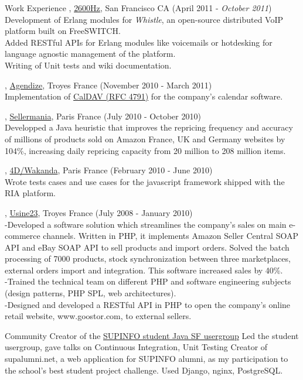 \documentclass{resume}
\begin{document}
\begin{category}{Work Experience}
,  \href{http://www.2600hz.com/}{2600Hz}, San Francisco CA (April 2011 - \emph{October 2011})\\
Development of Erlang modules for \emph{Whistle}, an open-source distributed VoIP platform built on FreeSWITCH.\\
Added RESTful APIs for Erlang modules like voicemails or hotdesking for language agnostic 
management of the platform.\\
Writing of Unit tests and wiki documentation.

, \href{http://www.agendize.com/}{Agendize}, Troyes France (November 2010 - March 2011)\\
Implementation of \href{http://www.ietf.org/rfc/rfc4791.txt}{CalDAV (RFC 4791)} for the company's calendar software.

, \href{http://www.sellermania.co.uk/}{Sellermania}, Paris France (July 2010 - October 2010)\\
Developped a Java heuristic that improves the repricing frequency and accuracy of millions of 
products sold on Amazon France, UK and Germany websites by 104\%, 
increasing daily repricing capacity from 20 million to 208 million items.

, \href{http://www.wakanda.org/}{4D/Wakanda}, Paris France (February 2010 - June 2010)\\
Wrote tests cases and use cases for the javascript framework shipped with the RIA platform.

, \href{http://www.usine23.com/}{Usine23}, Troyes France (July 2008 - January 2010)\\
-Developed a software solution which streamlines the company’s sales on main e-commerce channels. Written in PHP, it implements Amazon Seller Central SOAP API and eBay SOAP API to sell products and import orders. Solved the batch processing of 7000 products, stock synchronization between three marketplaces, external orders import and integration. This software increased sales by 40\%.\\
-Trained the technical team on different PHP and software engineering subjects (design patterns, PHP SPL, web architectures).\\
-Designed and developed a RESTful API in PHP to open the company’s online retail website, www.goostor.com, to external sellers.
\end{category}

\begin{category}{Community} 
\citemnobullet Creator of the \href{http://javalabsf.net/}{SUPINFO student Java SF usergroup}
Led the student usergroup, gave talks on Continuous Integration, Unit Testing
\citemnobullet Creator of supalumni.net, a web application for SUPINFO alumni, as my participation to the school's best student project challenge. 
Used Django, nginx, PostgreSQL.
\end{category}
\end{document}
